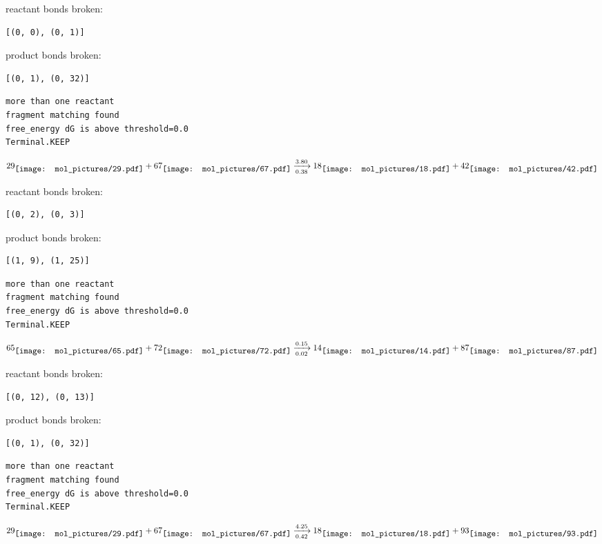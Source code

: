 \documentclass{article}
\begin{document}
reactant bonds broken:\begin{verbatim}
[(0, 0), (0, 1)]
\end{verbatim}
product bonds broken:\begin{verbatim}
[(0, 1), (0, 32)]
\end{verbatim}




\vspace{1cm}
\begin{verbatim}
more than one reactant
fragment matching found
free_energy dG is above threshold=0.0
Terminal.KEEP
\end{verbatim}
$$
29
\raisebox{-.5\height}{\texttt{[image: mol\_pictures/29.pdf]}}
+
67
\raisebox{-.5\height}{\texttt{[image: mol\_pictures/67.pdf]}}
\xrightarrow[0.38]{3.80}
18
\raisebox{-.5\height}{\texttt{[image: mol\_pictures/18.pdf]}}
+
42
\raisebox{-.5\height}{\texttt{[image: mol\_pictures/42.pdf]}}
$$


reactant bonds broken:\begin{verbatim}
[(0, 2), (0, 3)]
\end{verbatim}
product bonds broken:\begin{verbatim}
[(1, 9), (1, 25)]
\end{verbatim}




\vspace{1cm}
\begin{verbatim}
more than one reactant
fragment matching found
free_energy dG is above threshold=0.0
Terminal.KEEP
\end{verbatim}
$$
65
\raisebox{-.5\height}{\texttt{[image: mol\_pictures/65.pdf]}}
+
72
\raisebox{-.5\height}{\texttt{[image: mol\_pictures/72.pdf]}}
\xrightarrow[0.02]{0.15}
14
\raisebox{-.5\height}{\texttt{[image: mol\_pictures/14.pdf]}}
+
87
\raisebox{-.5\height}{\texttt{[image: mol\_pictures/87.pdf]}}
$$


reactant bonds broken:\begin{verbatim}
[(0, 12), (0, 13)]
\end{verbatim}
product bonds broken:\begin{verbatim}
[(0, 1), (0, 32)]
\end{verbatim}




\vspace{1cm}
\begin{verbatim}
more than one reactant
fragment matching found
free_energy dG is above threshold=0.0
Terminal.KEEP
\end{verbatim}
$$
29
\raisebox{-.5\height}{\texttt{[image: mol\_pictures/29.pdf]}}
+
67
\raisebox{-.5\height}{\texttt{[image: mol\_pictures/67.pdf]}}
\xrightarrow[0.42]{4.25}
18
\raisebox{-.5\height}{\texttt{[image: mol\_pictures/18.pdf]}}
+
93
\raisebox{-.5\height}{\texttt{[image: mol\_pictures/93.pdf]}}
$$
\end{document}
